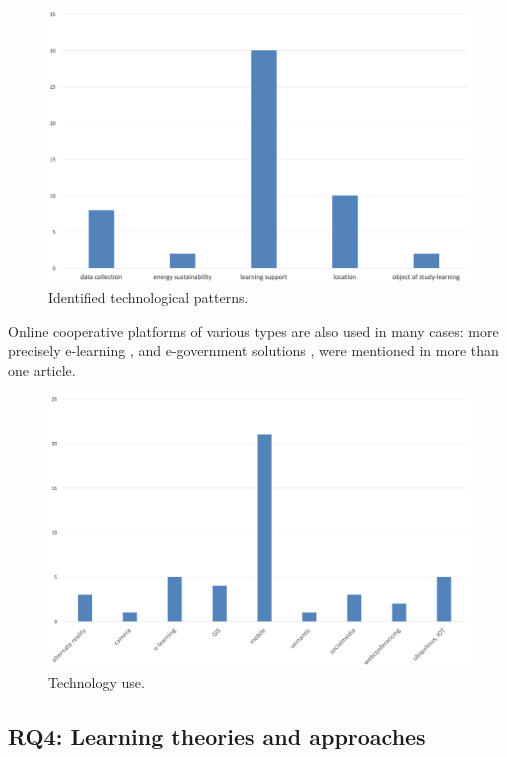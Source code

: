 \begin{figure}[htb]
\centering
\includegraphics[width=12cm]{img/technological_pattern}
\caption{Identified technological patterns.}
\label{fig:tech_patterns}
\end{figure}

Online cooperative platforms of various types are also used in many cases: more precisely e-learning \cite{schneider_location_2007},\cite{kabaka_elearning_2013} and e-government solutions \cite{wong_prototype_2005},\cite{deakin_intelligent_2012} were mentioned in more than one article.

\begin{figure}[htb]
\centering
\includegraphics[width=12cm]{img/technology}
\caption{Technology use.}
\label{fig:technology}
\end{figure}


\subsection*{RQ4: Learning theories and approaches}

